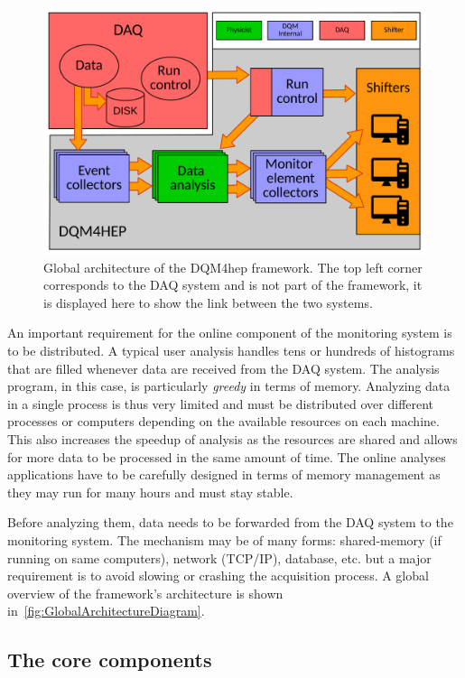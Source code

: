 \documentclass{webofc}
\begin{document}
\begin{figure}[!h]
  \centering
  \includegraphics[width=.95\textwidth]{figs/AnalysisModuleArchitecture.pdf}
  \caption{Global architecture of the DQM4hep framework. The top left corner corresponds to the DAQ system and is not part 
  of the framework, it is displayed here to show the link between the two systems.}
  \label{fig:GlobalArchitectureDiagram}
\end{figure}

An important requirement for the online component of the monitoring system is to be distributed. 
A typical user analysis handles tens or hundreds of histograms that are filled whenever data are received from the DAQ system. 
The analysis program, in this case, is particularly \textit{greedy} in terms of memory. 
Analyzing data in a single process is thus very limited and must be distributed over different processes or computers depending on the available resources on each machine.
This also increases the speedup of analysis as the resources are shared and allows for more data to be processed in the same amount of time.
The online analyses applications have to be carefully designed in terms of memory management as they may run for many hours and must stay stable.

Before analyzing them, data needs to be forwarded from the DAQ system to the monitoring system.
The mechanism may be of many forms: shared-memory (if running on same computers), network (TCP/IP), database, etc. but a major requirement is to avoid slowing or crashing the acquisition process.
A global overview of the framework's architecture is shown in~\autoref{fig:GlobalArchitectureDiagram}.

\subsection{The core components}
\label{subsec:core}
\end{document}
